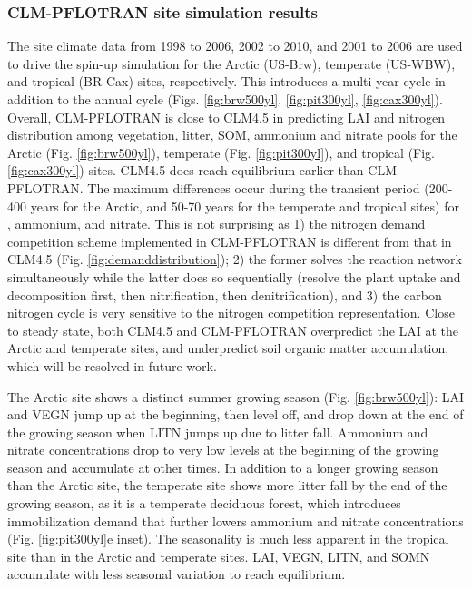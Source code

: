 \documentclass[gmd, manuscript]{copernicus}
\begin{document}
\subsubsection{CLM-PFLOTRAN site simulation results}
The site climate data from 1998 to 2006, 2002 to 2010, and 2001 to 2006  are
used to drive the spin-up simulation for the Arctic (US-Brw), temperate
(US-WBW), and tropical (BR-Cax) sites, respectively. This introduces a
multi-year cycle in addition to the annual cycle (Figs. \ref{fig:brw500yl},
\ref{fig:pit300yl}, \ref{fig:cax300yl}). Overall, CLM-PFLOTRAN is close to
CLM4.5 in predicting LAI and nitrogen distribution among vegetation, litter,
SOM, ammonium and nitrate pools for the Arctic (Fig. \ref{fig:brw500yl}),
temperate (Fig. \ref{fig:pit300yl}), and tropical (Fig. \ref{fig:cax300yl})
sites. CLM4.5 does reach equilibrium earlier than CLM-PFLOTRAN. The maximum
differences occur during the transient period (200-400 years for the Arctic, and 50-70
years for the temperate and tropical sites) for , ammonium, and
nitrate. This is not surprising as 1) the nitrogen demand competition
scheme implemented in CLM-PFLOTRAN is different from that in CLM4.5 (Fig.
\ref{fig:demanddistribution}); 2) the former solves the reaction network
simultaneously while the latter does so sequentially (resolve the plant uptake and
decomposition first, then nitrification, then denitrification), and 3) the
carbon nitrogen cycle is very sensitive to the nitrogen competition
representation. Close to steady state, both CLM4.5 and CLM-PFLOTRAN overpredict the LAI at the
Arctic and temperate sites, and underpredict soil organic matter accumulation, which will
be resolved in future work.

The Arctic site shows a distinct summer growing season (Fig.
\ref{fig:brw500yl}): LAI and VEGN jump up at the beginning, then level off, and
drop down at the end of the growing season when LITN jumps up due to litter fall.
Ammonium and nitrate concentrations drop to very low levels at the beginning of
the growing season and accumulate at other times. In addition to a longer growing
season than the Arctic site, the temperate site shows more litter fall by the
end of the growing season, as it is a temperate deciduous forest, which introduces
immobilization demand that further lowers ammonium and nitrate
concentrations (Fig. \ref{fig:pit300yl}e inset). The seasonality is much less
apparent in the tropical site than in the Arctic and temperate sites. LAI,
VEGN, LITN, and SOMN accumulate with less seasonal variation to reach 
equilibrium. 
\end{document}
